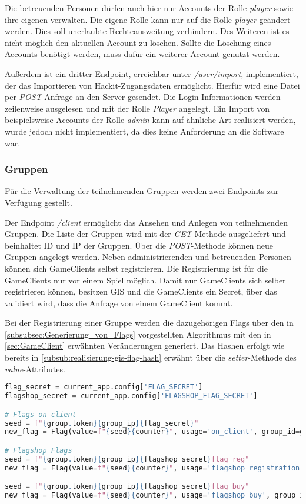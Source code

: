 Die betreuenden Personen dürfen auch hier nur Accounts der Rolle \textit{player} sowie ihre eigenen verwalten. Die eigene Rolle kann nur auf die Rolle \textit{player} geändert werden. Dies soll unerlaubte Rechteausweitung verhindern. Des Weiteren ist es nicht möglich den aktuellen Account zu löschen. Sollte die Löschung eines Accounts benötigt werden, muss dafür ein weiterer Account genutzt werden.

Außerdem ist ein dritter Endpoint, erreichbar unter \textit{/user/import}, implementiert, der das Importieren von Hackit-Zugangsdaten ermöglicht. Hierfür wird eine Datei per \textit{POST}-Anfrage an den Server gesendet. Die Login-Informationen werden zeilenweise ausgelesen und mit der Rolle \textit{Player} angelegt. Ein Import von beispielsweise Accounts der Rolle \textit{admin} kann auf ähnliche Art realisiert werden, wurde jedoch nicht implementiert, da dies keine Anforderung an die Software war.

\subsubsection{Gruppen}
Für die Verwaltung der teilnehmenden Gruppen werden zwei Endpoints zur Verfügung gestellt.

Der Endpoint \textit{/client} ermöglicht das Ansehen und Anlegen von teilnehmenden Gruppen.
Die Liste der Gruppen wird mit der \textit{GET}-Methode ausgeliefert und beinhaltet ID und IP der Gruppen. Über die \textit{POST}-Methode können neue Gruppen angelegt werden. Neben administrierenden und betreuenden Personen können sich GameClients selbst registrieren. Die Registrierung ist für die GameClients nur vor einem Spiel möglich. Damit nur GameClients sich selber registrieren können, besitzen GIS und die GameClients ein Secret, über das validiert wird, dass die Anfrage von einem GameClient kommt.

Bei der Registrierung einer Gruppe werden die dazugehörigen Flags über den in \autoref{subsubsec:Generierung_von_Flags} vorgestellten Algorithmus mit den in \autoref{sec:GameClient} erwähnten Veränderungen generiert. Das Hashen erfolgt wie bereits in \autoref{subsub:realisierung-gis-flag-hash} erwähnt über die \textit{setter}-Methode des \textit{value}-Attributes.

\begin{lstlisting}[language=Python, frame=single, caption={GIS Flaggenerierung}, captionpos=b, label={lst:gis-flag-gen}]
flag_secret = current_app.config['FLAG_SECRET']
flagshop_secret = current_app.config['FLAGSHOP_FLAG_SECRET']

# Flags on client
seed = f"{group.token}{group_ip}{flag_secret}"
new_flag = Flag(value=f"{seed}{counter}", usage='on_client', group_id=group.id)

# Flagshop Flags
seed = f"{group.token}{group_ip}{flagshop_secret}flag_reg"
new_flag = Flag(value=f"{seed}{counter}", usage='flagshop_registration', group_id=group.id)

seed = f"{group.token}{group_ip}{flagshop_secret}flag_buy"
new_flag = Flag(value=f"{seed}{counter}", usage='flagshop_buy', group_id=group.id)
\end{lstlisting}

